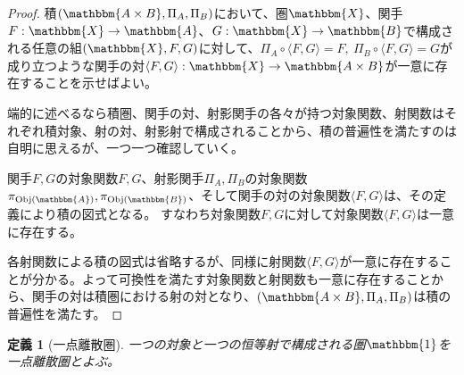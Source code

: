 \documentclass[dvipdfmx]{jsarticle}
\newcommand{\cat}[1]{\mathbbm{#1}}
\newcommand{\arrow}{\rightarrow}
\newcommand{\functor}[3]{#1:\cat{#2}\arrow \cat{#3}}
\newcommand{\tuple}[1]{\langle #1\rangle}
\newcommand{\obj}[1]{\mathrm{Obj}(\cat{#1})}
\newtheorem{proof}{証明}[section]
\newtheorem{define}{定義}[section]
\numberwithin{proof}{subsection}
\numberwithin{prop}{subsection}
\numberwithin{define}{subsection}
\begin{document}
	\begin{proof}
		積$(\cat{A\times B},\Pi_A,\Pi_B)$において、圏$\cat{X}$、関手$\functor{F}{X}{A}$、$\functor{G}{X}{B}$で構成される任意の組$(\cat{X},F,G)$に対して、$\Pi_A\circ\tuple{F,G}=F,\ \Pi_B\circ\tuple{F,G}=G$が成り立つような関手の対$\functor{\tuple{F,G}}{X}{A\times B}$が一意に存在することを示せばよい。
		\begin{center}
		\end{center}
		端的に述べるなら積圏、関手の対、射影関手の各々が持つ対象関数、射関数はそれぞれ積対象、射の対、射影射で構成されることから、積の普遍性を満たすのは自明に思えるが、一つ一つ確認していく。

		関手$F,G$の対象関数$F,G$、射影関手$\Pi_A,\Pi_B$の対象関数$\pi_{\obj{A}},\pi_{\obj{B}}$、そして関手の対の対象関数$\tuple{F,G}$は、その定義により積の図式となる。
		すなわち対象関数$F,G$に対して対象関数$\tuple{F,G}$は一意に存在する。
		\begin{center}
		\end{center}
		各射関数による積の図式は省略するが、同様に射関数$\tuple{F,G}$が一意に存在することが分かる。よって可換性を満たす対象関数と射関数も一意に存在することから、関手の対は積圏における射の対となり、$(\cat{A\times B},\Pi_A,\Pi_B)$は積の普遍性を満たす。

	\end{proof}
	\begin{define}[一点離散圏]
	一つの対象と一つの恒等射で構成される圏$\cat{1}$を一点離散圏とよぶ。
	\end{define}
\end{document}
